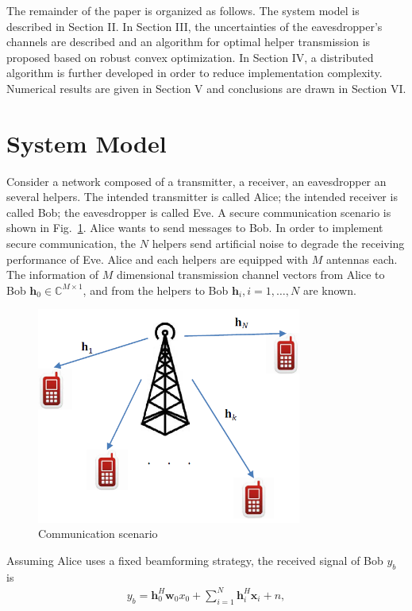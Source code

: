 \documentclass[journal]{IEEEtran}
\begin{document}
The remainder of the paper is organized as follows.  The system model is described in Section II.  In Section III, the uncertainties of the eavesdropper's channels are described and an algorithm for optimal helper transmission is proposed based on robust convex optimization.  In Section IV, a distributed algorithm is further developed in order to reduce implementation complexity.  Numerical results are given in Section V and conclusions are drawn in Section VI.

\section{System Model} \label{sec:system model}
Consider a network composed of a transmitter, a receiver, an eavesdropper an several helpers. The intended transmitter is called Alice; the intended receiver is called Bob; the eavesdropper is called Eve. A secure communication scenario is shown in Fig.~\ref{fig:system}. Alice wants to send messages to Bob. In order to implement secure communication, the $N$ helpers send artificial noise to degrade the receiving performance of Eve.  Alice and each helpers are equipped with $M$ antennas each. The information of $M$ dimensional transmission channel vectors from Alice to Bob $\mathbf{h}_0 \in \mathbb{C}^{M \times 1}$, and from the helpers to Bob $\mathbf{h}_i, i = 1,\ldots,N$ are known.
\begin{figure}[!htbp]
	\centering
	\includegraphics[width=8.7cm]{system.png} %
	\caption{Communication scenario}
	\label{fig:system}
\end{figure}
Assuming Alice uses a fixed beamforming strategy, the received signal of Bob $y_b$ is
\begin{eqnarray}
y_b =\mathbf{h}_{0}^{H}\mathbf{w}_0 x_0 + \sum_{i=1}^N \mathbf{h}_{i}^H\mathbf{x}_{i} + n,
\end{eqnarray}
\end{document}
